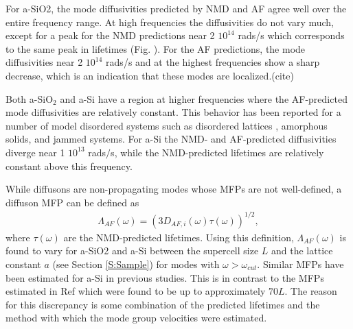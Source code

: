 \documentclass[aps,prb,twocolumn,superscriptaddress,footinbib,amsmath,amssymb,floatfix]{revtex4}
\begin{document}
For a-SiO2, the mode diffusivities predicted by NMD and AF agree 
well over the entire frequency range. At high frequencies the 
diffusivities do not vary much, except for a 
peak for the NMD predictions near 2 $10^{14}$ rads/s which 
corresponds to the same peak in lifetimes (Fig. ). For 
the AF predictions, the mode diffusivities near 
2 $10^{14}$ rads/s and at the highest frequencies 
show a sharp decrease, which is an indication 
that these modes are localized.(cite) 

Both a-SiO$_2$ and a-Si have a region at higher frequencies where the 
AF-predicted mode diffusivities are relatively constant. This behavior 
has been reported for a number of model disordered systems such as 
disordered lattices
\cite{sheng_heat_1991,beltukov_ioffe-regel_2013,larkin_predicting_2013}, 
amorphous solids,\cite{he_thermal_2011} 
and jammed systems.\cite{xu_energy_2009,vitelli_heat_2010}  
For a-Si the NMD- and AF-predicted diffusivities diverge 
near 1 $10^{13}$ rads$/$s, while the NMD-predicted lifetimes 
are relatively constant above this frequency.  

While diffusons are non-propagating modes whose MFPs are not 
well-defined, a diffuson MFP can be defined as
\begin{equation}\label{EQ:LambdaAF}
\begin{split}
\Lambda_{AF}(\omega) = (3D_{AF,i}(\omega)\tau(\omega))^{1/2},
\end{split}
\end{equation}
where $\tau(\omega)$ are the NMD-predicted lifetimes. Using this 
definition, $\Lambda_{AF}(\omega)$ is found to vary 
for a-SiO2 and a-Si between 
the supercell size $L$ and the lattice constant $a$ 
(see Section \ref{S:Sample}) for modes with $\omega > \omega_{cut}$. 
Similar MFPs have been estimated for a-Si in 
previous studies.\cite{feldman_thermal_1993,feldman_numerical_1999} 
This is in contrast to the MFPs estimated in Ref 
which were found to be up to approximately $70 L$. The reason 
for this discrepancy is some combination of the predicted lifetimes 
and the method with which the mode group velocities were estimated.
\cite{he_heat_2011}
\end{document}
